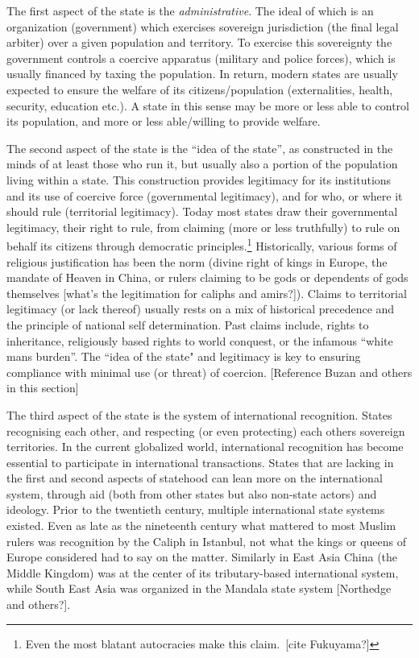 \documentclass[12pt]{article}
\begin{document}
The first aspect of the state is the \textit{administrative}. The ideal of
which is an organization (government) which exercises sovereign jurisdiction
(the final legal arbiter) over a given population and territory. To exercise
this sovereignty the government controls a coercive apparatus (military and
police forces), which is usually financed by taxing the population. In return,
modern states are usually expected to ensure the welfare of its
citizens/population (externalities, health, security, education etc.). A state
in this sense may be more or less able to control its population, and more or
less able/willing to provide welfare.

The second aspect of the state is the ``idea of the state'', as constructed in
the minds of at least those who run it, but usually also a portion of the
population living within a state. This construction provides legitimacy for its
institutions and its use of coercive force (governmental legitimacy), and for
who, or where it should rule (territorial legitimacy). Today most states draw
their governmental legitimacy, their right to rule, from claiming (more or less
truthfully) to rule on behalf its citizens through democratic
principles.\footnote{Even the most blatant autocracies make this claim. [cite
Fukuyama?]} Historically, various forms of religious justification has been the
norm (divine right of kings in Europe, the mandate of Heaven in China, or rulers
claiming to be gods or dependents of gods themselves [what's the legitimation
for caliphs and amirs?]). Claims to territorial legitimacy (or lack thereof)
usually rests on a mix of historical precedence and the principle of national
self determination. Past claims include, rights to inheritance, religiously
based rights to world conquest, or the infamous ``white mans burden''. The
``idea of the state" and legitimacy is key to ensuring compliance with minimal
use (or threat) of coercion. [Reference Buzan and others in this section]

The third aspect of the state is the system of international recognition. States
recognising each other, and respecting (or even protecting) each others
sovereign territories. In the current globalized world, international
recognition has become essential to participate in international transactions.
States that are lacking in the first and second aspects of statehood can lean
more on the international system, through aid (both from other states but also
non-state actors) and ideology. Prior to the twentieth century, multiple
international state systems existed. Even as late as the nineteenth century what
mattered to most Muslim rulers was recognition by the Caliph in Istanbul, not
what the kings or queens of Europe considered had to say on the matter.
Similarly in East Asia China (the Middle Kingdom) was at the center of its
tributary-based international system, while South East Asia was organized in the
Mandala state system [Northedge and others?].
\end{document}
